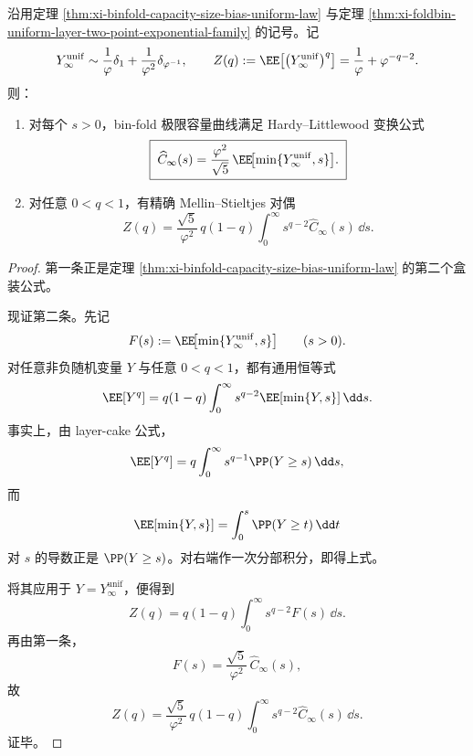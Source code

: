 \begin{theorem}\label{thm:xi-binfold-capacity-hl-mellin-duality-uniform-law}
沿用定理 \ref{thm:xi-binfold-capacity-size-bias-uniform-law} 与定理 \ref{thm:xi-foldbin-uniform-layer-two-point-exponential-family} 的记号。记
\[
Y_\infty^{\mathrm{unif}}
\sim
\frac{1}{\varphi}\delta_1+\frac{1}{\varphi^2}\delta_{\varphi^{-1}},
\qquad
Z(q):=\EE\!\left[\bigl(Y_\infty^{\mathrm{unif}}\bigr)^q\right]
=
\frac{1}{\varphi}+\varphi^{-q-2}.
\]
则：
\begin{enumerate}
  \item 对每个 \(s>0\)，bin-fold 极限容量曲线满足 Hardy--Littlewood 变换公式
  \[
  \boxed{\;
  \widehat C_\infty(s)
  =
  \frac{\varphi^2}{\sqrt5}\,
  \EE\!\bigl[\min\{Y_\infty^{\mathrm{unif}},s\}\bigr].\;}
  \]
  \item 对任意 \(0<q<1\)，有精确 Mellin--Stieltjes 对偶
  \[
  \boxed{\;
  Z(q)
  =
  \frac{\sqrt5}{\varphi^2}\,
  q(1-q)
  \int_0^\infty s^{q-2}\widehat C_\infty(s)\,\dd s.\;}
  \]
\end{enumerate}
\end{theorem}
\begin{proof}
第一条正是定理 \ref{thm:xi-binfold-capacity-size-bias-uniform-law} 的第二个盒装公式。

现证第二条。先记
\[
F(s):=\EE\!\bigl[\min\{Y_\infty^{\mathrm{unif}},s\}\bigr]
\qquad (s>0).
\]
对任意非负随机变量 \(Y\) 与任意 \(0<q<1\)，都有通用恒等式
\[
\EE[Y^q]
=
q(1-q)\int_0^\infty s^{q-2}\EE[\min\{Y,s\}]\,\dd s.
\]
事实上，由 layer-cake 公式，
\[
\EE[Y^q]
=
q\int_0^\infty s^{q-1}\PP(Y\ge s)\,\dd s,
\]
而
\[
\EE[\min\{Y,s\}]
=
\int_0^s \PP(Y\ge t)\,\dd t
\]
对 \(s\) 的导数正是 \(\PP(Y\ge s)\)。对右端作一次分部积分，即得上式。

将其应用于 \(Y=Y_\infty^{\mathrm{unif}}\)，便得到
\[
Z(q)
=
q(1-q)\int_0^\infty s^{q-2}F(s)\,\dd s.
\]
再由第一条，
\[
F(s)=\frac{\sqrt5}{\varphi^2}\,\widehat C_\infty(s),
\]
故
\[
Z(q)
=
\frac{\sqrt5}{\varphi^2}\,
q(1-q)\int_0^\infty s^{q-2}\widehat C_\infty(s)\,\dd s.
\]
证毕。
\end{proof}

